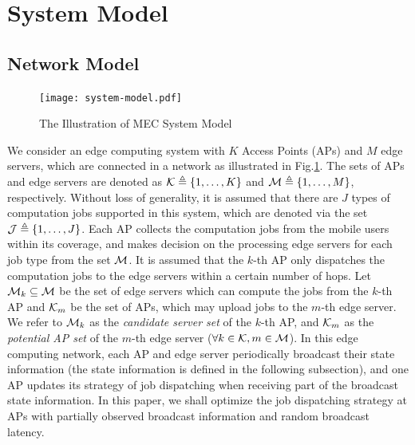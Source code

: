\section{System Model}
\label{sec:model}
\subsection{Network Model}
\begin{figure}[htp!]
    \centering
    \texttt{[image: system-model.pdf]}
    \caption{The Illustration of MEC System Model}
    \label{fig:system}
\end{figure}

We consider an edge computing system with $K$ Access Points (APs) and $M$ edge servers, which are connected in a network as illustrated in Fig.\ref{fig:system}.
The sets of APs and edge servers are denoted as $\mathcal{K} \triangleq \{1,\dots,K\}$ and $\mathcal{M} \triangleq \{1,\dots,M\}$, respectively.
Without loss of generality, it is assumed that there are $J$ types of computation jobs supported in this system, which are denoted via the set $\mathcal{J} \triangleq \{1,\dots,J\}$.
Each AP collects the computation jobs from the mobile users within its coverage, and makes decision on the processing edge servers for each job type from the set $\mathcal{M}$.
It is assumed that the $k$-th AP only dispatches the computation jobs to the edge servers within a certain number of hops.
Let $\mathcal{M}_{k} \subseteq \mathcal{M}$ be the set of edge servers which can compute the jobs from the $k$-th AP and $\mathcal{K}_{m}$ be the set of APs, which may upload jobs to the $m$-th edge server.
We refer to $\mathcal{M}_{k}$ as the \emph{candidate server set} of the $k$-th AP, and $\mathcal{K}_{m}$ as the \emph{potential AP set} of the $m$-th edge server ($\forall k\in\mathcal{K}, m\in\mathcal{M}$).
In this edge computing network, each AP and edge server periodically broadcast their state information (the state information is defined in the following subsection), and one AP updates its strategy of job dispatching when receiving part of the broadcast state information.
In this paper, we shall optimize the job dispatching strategy at APs with partially observed broadcast information and random broadcast latency.

